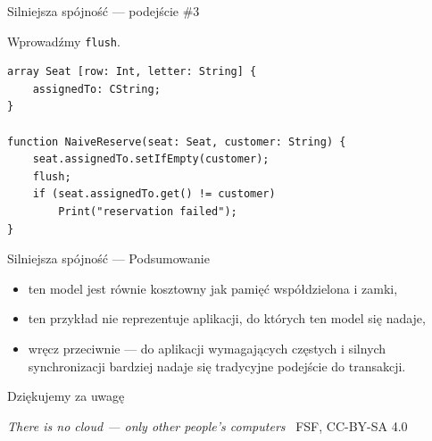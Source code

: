 \documentclass{beamer}
\begin{document}
\begin{frame}[fragile]{Silniejsza spójność --- podejście \#3}
    \begin{card}
        Wprowadźmy \texttt{flush}.
    \end{card}
    \begin{card}
        \begin{lstlisting}
array Seat [row: Int, letter: String] {
    assignedTo: CString;
}

function NaiveReserve(seat: Seat, customer: String) {
    seat.assignedTo.setIfEmpty(customer);
    flush;
    if (seat.assignedTo.get() != customer)
        Print("reservation failed");
}
        \end{lstlisting}
    \end{card}
\end{frame}

\begin{frame}[fragile]{Silniejsza spójność --- Podsumowanie}
    \begin{card}
        \begin{itemize}[<+->]
            \item ten model jest równie kosztowny jak pamięć współdzielona i zamki,
            \item ten przykład nie reprezentuje aplikacji, do których ten model się nadaje,
            \item wręcz przeciwnie --- do aplikacji wymagających częstych i silnych synchronizacji bardziej nadaje się tradycyjne podejście do transakcji.
        \end{itemize}
    \end{card}
\end{frame}

\begin{frame}
    \begin{card}
        {\LARGE Dziękujemy za uwagę}
    \end{card}
    \begin{card}
        \textit{There is no cloud --- only other people's computers} \textcopyleft~FSF, CC-BY-SA 4.0
    \end{card}
\end{frame}
\end{document}
